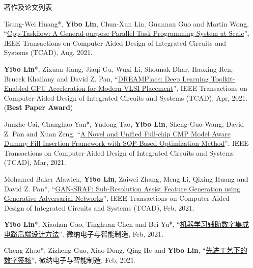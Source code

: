 \begin{rSection}{著作及论文列表}
\begin{description}[font=\normalfont, rightmargin=2em]
{}
            

\item[{[J74]}]{
        Tsung-Wei Huang*, \textbf{Yibo Lin}, Chun-Xun Lin, Guannan Guo and Martin Wong, 
    ``\href{https://doi.org/10.1109/TCAD.2020.3025075}{Cpp-Taskflow: A General-purpose Parallel Task Programming System at Scale}'', 
    IEEE Transactions on Computer-Aided Design of Integrated Circuits and Systems (TCAD), Aug, 2021.
    
}
            

\item[{[J73]}]{
        \textbf{Yibo Lin}*, Zixuan Jiang, Jiaqi Gu, Wuxi Li, Shounak Dhar, Haoxing Ren, Brucek Khailany and David Z. Pan, 
    ``\href{https://doi.org/10.1109/TCAD.2020.3003843}{DREAMPlace: Deep Learning Toolkit-Enabled GPU Acceleration for Modern VLSI Placement}'', 
    IEEE Transactions on Computer-Aided Design of Integrated Circuits and Systems (TCAD), Apr, 2021.
    (\textbf{Best Paper Award})
}
            

\item[{[J72]}]{
        Junzhe Cai, Changhao Yan*, Yudong Tao, \textbf{Yibo Lin}, Sheng-Guo Wang, David Z. Pan and Xuan Zeng, 
    ``\href{https://doi.org/10.1109/TCAD.2020.3001380}{A Novel and Unified Full-chip CMP Model Aware Dummy Fill Insertion Framework with SQP-Based Optimization Method}'', 
    IEEE Transactions on Computer-Aided Design of Integrated Circuits and Systems (TCAD), Mar, 2021.
    
}
            

\item[{[J71]}]{
        Mohamed Baker Alawieh, \textbf{Yibo Lin}, Zaiwei Zhang, Meng Li, Qixing Huang and David Z. Pan*, 
    ``\href{https://doi.org/10.1109/TCAD.2020.2995338}{GAN-SRAF: Sub-Resolution Assist Feature Generation using Generative Adversarial Networks}'', 
    IEEE Transactions on Computer-Aided Design of Integrated Circuits and Systems (TCAD), Feb, 2021.
    
}
            

\item[{[J70]}]{
        \textbf{Yibo Lin}*, Xiaohan Gao, Tinghuan Chen and Bei Yu*, 
    ``\href{https://doi.org/10.19816/j.cnki.10-1594/tn.2021.02.011}{机器学习辅助数字集成电路后端设计方法}'', 
    微纳电子与智能制造, Feb, 2021.
    
}
            

\item[{[J69]}]{
        Cheng Zhuo*, Zizheng Guo, Xiao Dong, Qing He and \textbf{Yibo Lin}, 
    ``\href{https://doi.org/ 10.19816/j.cnki.10-1594/tn.2021.02.001}{先进工艺下的数字签核}'', 
    微纳电子与智能制造, Feb, 2021.
    
}
\end{description}
\end{rSection}
